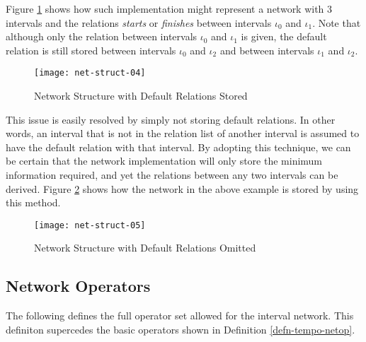 \documentclass[11pt]{report}
\begin{document}
          Figure \ref{figu-impln-nws04} shows how such implementation might
          represent a network with 3 intervals and the relations {\em starts}
          or {\em finishes} between intervals $\iota_0$ and $\iota_1$. Note
          that although only the relation between intervals $\iota_0$ and
          $\iota_1$ is given, the default relation is still stored between
          intervals $\iota_0$ and $\iota_2$ and between intervals $\iota_1$ and
          $\iota_2$.

          \begin{figure}[tbhp]
            \begin{center}
              \texttt{[image: net-struct-04]}
              \caption{Network Structure with Default Relations Stored}
              \label{figu-impln-nws04}
            \end{center}
          \end{figure}

          This issue is easily resolved by simply not storing default
          relations. In other words, an interval that is not in the relation
          list of another interval is assumed to have the default relation with
          that interval. By adopting this technique, we can be certain that the
          network implementation will only store the minimum information
          required, and yet the relations between any two intervals can be
          derived. Figure \ref{figu-impln-nws05} shows how the network in
          the above example is stored by using this method.

          \begin{figure}[tbhp]
            \begin{center}
              \texttt{[image: net-struct-05]}
              \caption{Network Structure with Default Relations Omitted}
              \label{figu-impln-nws05}
            \end{center}
          \end{figure}

      \subsection{Network Operators}
        \label{subs-impln-netop}

        The following defines the full operator set allowed for the interval
        network. This definiton supercedes the basic operators shown in
        Definition \ref{defn-tempo-netop}.
\end{document}
